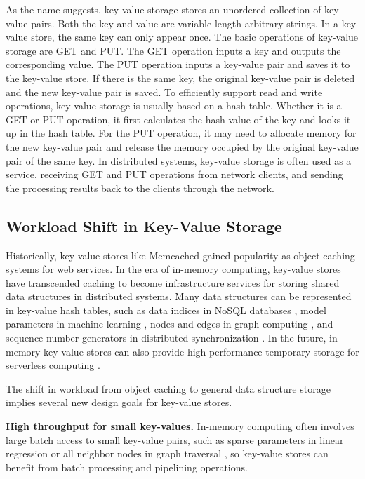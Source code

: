 As the name suggests, key-value storage stores an unordered collection of key-value pairs. Both the key and value are variable-length arbitrary strings. In a key-value store, the same key can only appear once. The basic operations of key-value storage are GET and PUT. The GET operation inputs a key and outputs the corresponding value. The PUT operation inputs a key-value pair and saves it to the key-value store. If there is the same key, the original key-value pair is deleted and the new key-value pair is saved.
To efficiently support read and write operations, key-value storage is usually based on a hash table. Whether it is a GET or PUT operation, it first calculates the hash value of the key and looks it up in the hash table. For the PUT operation, it may need to allocate memory for the new key-value pair and release the memory occupied by the original key-value pair of the same key.
In distributed systems, key-value storage is often used as a service, receiving GET and PUT operations from network clients, and sending the processing results back to the clients through the network.

\subsection{Workload Shift in Key-Value Storage}
\label{kvdirect:sec:workload-shift}

Historically, key-value stores like Memcached \cite{fitzpatrick2004distributed} gained popularity as object caching systems for web services. In the era of in-memory computing, key-value stores have transcended caching to become infrastructure services for storing shared data structures in distributed systems. Many data structures can be represented in key-value hash tables, such as data indices in NoSQL databases \cite{chang2008bigtable}, model parameters in machine learning \cite{li2014scaling}, nodes and edges in graph computing \cite{shao2013trinity,xiao17tux2}, and sequence number generators in distributed synchronization \cite{kalia2016design,eris}. In the future, in-memory key-value stores can also provide high-performance temporary storage for serverless computing \cite{jonas2019cloud}.

The shift in workload from object caching to general data structure storage implies several new design goals for key-value stores.

\textbf{High throughput for small key-values.} In-memory computing often involves large batch access to small key-value pairs, such as sparse parameters in linear regression \cite{li2014algorithmic,xiao17tux2} or all neighbor nodes in graph traversal \cite{shao2013trinity}, so key-value stores can benefit from batch processing and pipelining operations.

